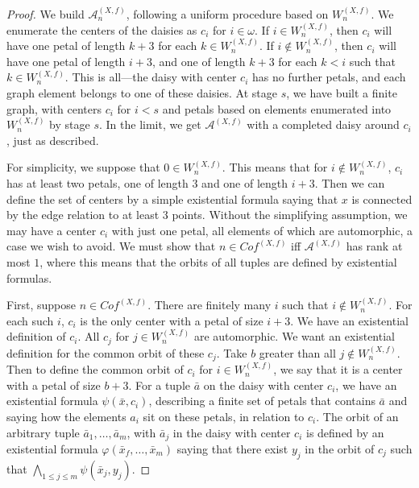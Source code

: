 \documentclass{article}
\begin{document}
\begin{proof}  

We build $\mathcal{A}^{(X,f)}_n$, following a uniform procedure based on $W^{(X,f)}_n$.  We enumerate the centers of the daisies as $c_i$ for $i\in\omega$.  If $i\in W_n^{(X,f)}$, then $c_i$ will have one petal of length $k+3$ for each $k\in W_n^{(X,f)}$.  If $i\notin W_n^{(X,f)}$, then $c_i$ will have one petal of length $i+3$, and one of length $k+3$ for each $k < i$ such that $k\in W_n^{(X,f)}$.  This is all---the daisy with center $c_i$ has no further petals, and each graph element belongs to one of these daisies.  At stage $s$, we have built a finite graph, with centers $c_i$ for $i < s$ and petals based on elements enumerated into $W_n^{(X,f)}$ by stage $s$.  In the limit, we get $\mathcal{A}^{(X,f)}$ with a completed daisy around $c_i$, just as described.  

For simplicity, we suppose that $0\in W_n^{(X,f)}$.  This means that for $i\notin W_n^{(X,f)}$, $c_i$ has at least two petals, one of length $3$ and one of length $i+3$.  Then we can define the set of centers by a simple existential formula saying that $x$ is connected by the edge relation to at least $3$ points.  Without the simplifying assumption, we may have a center $c_i$ with just one petal, all elements of which are automorphic, a case we wish to avoid.
We must show that $n\in Cof^{(X,f)}$ iff $\mathcal{A}^{(X,f)}$ has rank at most $1$, where this means that the orbits of all tuples are defined by existential formulas.       

First, suppose $n\in Cof^{(X,f)}$.  There are finitely many $i$ such that $i\notin W_n^{(X,f)}$.  For each such $i$, $c_i$ is the only center with a petal of size $i+3$.  We have an existential definition of $c_i$.  All $c_j$ for $j\in W_n^{(X,f)}$ are automorphic.  We want an existential definition for the common orbit of these $c_j$.  Take $b$ greater than all $j\notin W_n^{(X,f)}$.  Then to define the common orbit of $c_i$ for $i\in W_n^{(X,f)}$, we say that it is a center with a petal of size $b+3$.  For a tuple $\bar{a}$ on the daisy with center $c_i$, we have an existential formula $\psi(\bar{x},c_i)$, describing a finite set of petals that contains $\bar{a}$ and saying how the elements $a_i$ sit on these petals, in relation to $c_i$.  The orbit of an arbitrary tuple $\bar{a}_1,\ldots,\bar{a}_m$, with $\bar{a}_j$ in the daisy with center $c_i$ is defined by an existential formula $\varphi(\bar{x}_f,\ldots,\bar{x}_ m)$ saying that there exist $y_j$ in the orbit of $c_j$ such that $\bigwedge_{1\leq j\leq m}\psi(\bar{x}_j,y_j)$.    


\end{proof}
\end{document}
